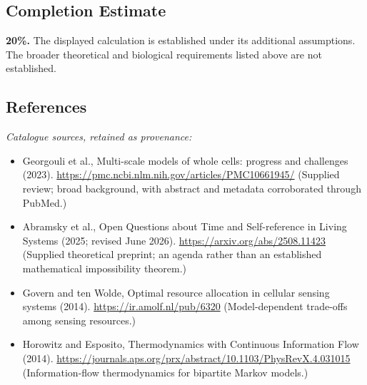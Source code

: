 \documentclass[11pt]{article}
\begin{document}
\subsection{Completion Estimate}
\textbf{20\%.} The displayed calculation is established under its additional assumptions. The broader theoretical and biological requirements listed above are not established.
\subsection{References}
\noindent\emph{Catalogue sources, retained as provenance:}
\begin{itemize}
\item Georgouli et al., Multi-scale models of whole cells: progress and challenges (2023). \url{https://pmc.ncbi.nlm.nih.gov/articles/PMC10661945/} (Supplied review; broad background, with abstract and metadata corroborated through PubMed.)
\item Abramsky et al., Open Questions about Time and Self-reference in Living Systems (2025; revised June 2026). \url{https://arxiv.org/abs/2508.11423} (Supplied theoretical preprint; an agenda rather than an established mathematical impossibility theorem.)
\item Govern and ten Wolde, Optimal resource allocation in cellular sensing systems (2014). \url{https://ir.amolf.nl/pub/6320} (Model-dependent trade-offs among sensing resources.)
\item Horowitz and Esposito, Thermodynamics with Continuous Information Flow (2014). \url{https://journals.aps.org/prx/abstract/10.1103/PhysRevX.4.031015} (Information-flow thermodynamics for bipartite Markov models.)
\end{itemize}
\end{document}
